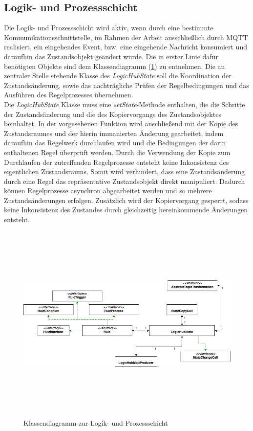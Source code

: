     \subsection{Logik- und Prozessschicht}
    \label{subsec:logikschicht}
    Die Logik- und Prozessschicht wird aktiv, wenn durch eine bestimmte Kommunikationsschnittstelle, im Rahmen der Arbeit ausschließlich durch \acs{MQTT} realisiert, ein eingehendes 
    Event, bzw. eine eingehende Nachricht konsumiert und daraufhin das Zustandsobjekt geändert wurde. Die in erster Linie dafür benötigten Objekte sind dem 
    Klassendiagramm (\ref{fig:patternlogik}) zu entnehmen. Die an zentraler Stelle stehende Klasse des \textit{LogicHubState} soll die Koordination 
    der Zustandsänderung, sowie das nachträgliche Prüfen der Regelbedingungen und das Ausführen des Regelprozesses übernehmen. 
    \\
    Die \textit{LogicHubState} Klasse muss eine \textit{setState}-Methode enthalten, die die Schritte der Zustandsänderung und die des Kopiervorgangs des Zustandsobjektes beinhaltet. 
    In der vorgesehenen Funktion wird anschließend mit der Kopie des Zustandsraumes und der hierin immanierten Änderung gearbeitet, indem daraufhin das Regelwerk durchlaufen wird und die Bedingungen 
    der darin enthaltenen Regel überprüft werden. Durch die Verwendung der Kopie zum Durchlaufen der zutreffenden Regelprozesse entsteht keine Inkonsistenz des eigentlichen Zustandsraums.  
    Somit wird verhindert, dass eine Zustandsänderung durch eine Regel das repräsentative Zustandsobjekt direkt manipuliert. Dadurch können Regelprozesse asynchron abgearbeitet werden 
    und so mehrere Zustandsänderungen erfolgen. Zusätzlich wird der Kopiervorgang gesperrt, sodass keine Inkonsistenz des Zustandes durch gleichzeitig hereinkommende Änderungen entsteht. 
    \begin{figure}[hbt!]
        \centering
        \includegraphics[width=14cm,height=10cm,keepaspectratio]{images/Logikschicht_final.png}
        \caption{Klassendiagramm zur Logik- und Prozessschicht}
        \label{fig:patternlogik}
    \end{figure}
